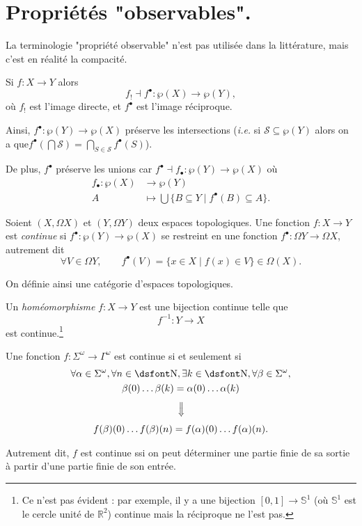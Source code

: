 \documentclass[./main]{subfiles}
\begin{document}

  \chapter{Propriétés "observables".}

  La terminologie "propriété observable" n'est pas utilisée dans la littérature, mais c'est en réalité la compacité.

  \begin{rmk}[Rappel]
    Si $f : X \to Y$ alors  \[
    f_! \dashv f^\bullet: \wp(X) \to \wp(Y)
    ,\]
    où $f_!$ est l'image directe, et $f^\bullet$ est l'image réciproque.

    Ainsi, $f^\bullet : \wp(Y) \to \wp(X)$  préserve les intersections (\textit{i.e.} si $\mathcal{S}\subseteq \wp(Y)$ alors on a que$f^\bullet (\bigcap \mathcal{S}) = \bigcap_{S \in \mathcal{S}}  f^\bullet(S)$).

    De plus, $f^\bullet$ préserve les unions car $f^\bullet \dashv f_\bullet : \wp(Y) \to \wp(X)$ où
     \begin{align*}
      f_\bullet: \wp(X) &\longrightarrow \wp(Y) \\
      A &\longmapsto \bigcup \{B \subseteq Y  \mid f^\bullet(B) \subseteq A\} 
    .\end{align*}
  \end{rmk}

  \begin{defn}
    Soient $(X, \Omega X)$ et $(Y, \Omega Y)$ deux espaces topologiques.
    Une fonction $f : X \to Y$ est \textit{continue} si $f^\bullet : \wp(Y) \to \wp(X)$ se restreint en une fonction $f^\bullet : \Omega Y \to \Omega X$, autrement dit 
    \[
    \forall  V \in \Omega Y, \quad\quad f^\bullet(V) = \{x \in X  \mid f(x) \in V\}  \in \Omega(X)
    .\]

    On définie ainsi une catégorie d'espaces topologiques.

    Un \textit{homéomorphisme} $f : X \to Y$ est une bijection continue telle que 
    \[
    f^{-1} : Y \to X
    \]
    est continue.\footnote{Ce n'est pas évident : par exemple, il y a une bijection $[0, 1] \to \mathds S^1$ (où $\mathds S^1$ est le cercle unité de $\mathds{R}^2$) continue mais la réciproque ne l'est pas.}
  \end{defn}

  \begin{lem}
    Une fonction $f : \Sigma^\omega \to \Gamma^\omega$ est continue si et seulement si
    \begin{gather*}
    \forall \alpha \in \Sigma^\omega, \forall n \in \mathds{N},
    \exists k \in \mathds{N}, \forall \beta \in \Sigma^\omega,\\
    \beta(0)\ldots\beta(k) = \alpha(0)\ldots\alpha(k)\\
    \vertical\implies\\
    f(\beta)(0) \ldots f(\beta)(n) = f(\alpha)(0) \ldots f(\alpha)(n)
    .\end{gather*}

    Autrement dit, $f$ est continue ssi on peut déterminer une partie finie de sa sortie à partir d'une partie finie de son entrée.
  \end{lem}
\end{document}

